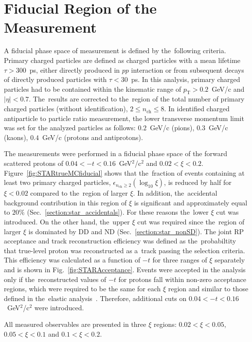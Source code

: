 \section{Fiducial Region of the Measurement}\label{section:star_fiducial}
A fiducial phase space of measurement  is defined by the~following criteria. Primary charged particles are defined as charged particles with a mean lifetime $\tau >300$~ps, either directly produced in $pp$ interaction or from subsequent decays of directly produced particles with $\tau <30$~ps. In this analysis, primary charged particles had to be contained within the kinematic range of $p_\textrm{T}>0.2$~GeV/c and $|\eta|<0.7$.
The~results are corrected to the~region of the total number of primary charged particles (without identification), $2\leq n_\textrm{ch} \leq 8$.  In identified charged antiparticle to particle ratio measurement, the lower transverse momentum limit was set for the analyzed particles as follows: $0.2$~GeV/c (pions), $0.3$~GeV/c (kaons), $0.4$~GeV/c (protons and antiprotons).

The measurements were performed in a fiducial phase space of the forward scattered protons of $0.04<-t<0.16$~GeV$^{2}$/c$^2$ and $0.02 < \xi<0.2$. Figure~\ref{fig:STARtrueMCfiducial} shows that the~fraction  of events containing at least two primary charged particles, $\epsilon_{n_\textrm{ch}\geq 2}(\log_{10}\xi)$,  is reduced by half for $\xi <0.02$ compared to the~region of larger $\xi$. In addition, the~accidental background contribution in  this region of $\xi$ is significant and  approximately equal to $20\%$ (Sec.~\ref{section:star_accidentals}). For these reasons the~lower $\xi$ cut was introduced. On the other hand, the~upper $\xi$ cut was required since the~region of larger $\xi$ is dominated by \ac{DD} and \ac{ND} (Sec.~\ref{section:star_nonSD}). The joint RP  acceptance and track reconstruction efficiency was defined as the~probabiltity that true-level proton was reconstructed as a~track passing the selection criteria. This efficiency was calculated as a function of $-t$ for three ranges of $\xi$ separately and is shown in Fig.~\ref{fig:STARAcceptance}. 
Events were accepted in the analysis only if the~reconstructed values of $-t$ for protons fall within non-zero acceptance regions, which were required to be the same for each $\xi$ region  and similar to those defined in the~elastic analysis~\cite{STARelastic2015}. Therefore, additional cuts on $0.04 < -t < 0.16$~GeV$^2$/c$^2$ were introduced.

All measured observables are presented in three $\xi$ regions: $0.02<\xi<0.05$, $0.05<\xi<0.1$ and $0.1<\xi<0.2$.

